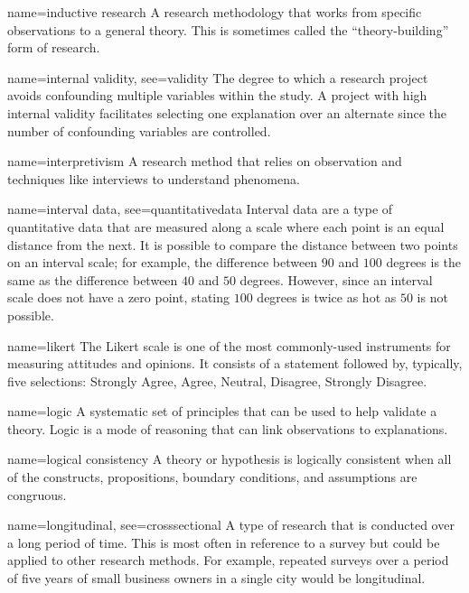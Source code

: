 {name={inductive research}}
{%
	A research methodology that works from specific observations to a general theory. This is sometimes called the ``theory-building'' form of research.
}


{name={internal validity},
	see={validity}}
{%
	The degree to which a research project avoids confounding multiple variables within the study. A project with high internal validity facilitates selecting one explanation over an alternate since the number of confounding variables are controlled.
}

{name={interpretivism}}
{%
	A research method that relies on observation and techniques like interviews to understand phenomena. 
}

{name={interval data},
	see={quantitativedata}}
{%
	Interval data are a type of quantitative data that are measured along a scale where each point is an equal distance from the next. It is possible to compare the distance between two points on an interval scale; for example, the difference between $ 90 $ and $ 100 $ degrees is the same as the difference between $ 40 $ and $ 50 $ degrees. However, since an interval scale does not have a zero point, stating $ 100 $ degrees is twice as hot as $ 50 $ is not possible. 
}

{name={likert}}
{%
	The Likert scale is one of the most commonly-used instruments for measuring attitudes and opinions. It consists of a statement followed by, typically, five selections: Strongly Agree, Agree, Neutral, Disagree, Strongly Disagree.
}

{name={logic}}
{%
	A systematic set of principles that can be used to help validate a theory. Logic is a mode of reasoning that can link observations to explanations.
}

{name={logical consistency}}
{%
	A theory or hypothesis is logically consistent when all of the constructs, propositions, boundary conditions, and assumptions are congruous.
}

{name={longitudinal},
	see={crosssectional}}
{%
	A type of research that is conducted over a long period of time. This is most often in reference to a survey but could be applied to other research methods. For example, repeated surveys over a period of five years of small business owners in a single city would be longitudinal. 
}

